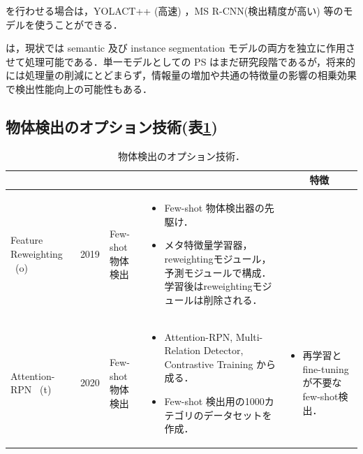 \documentclass[twocolumn]{jsarticle} %
\begin{document}
を行わせる場合は，YOLACT++ (高速) \cite{BZXL20}，MS R-CNN(検出精度が高い) \cite{HHGHW19} 等のモデルを使うことができる．

は，現状では semantic 及び instance segmentation モデルの両方を独立に作用させて処理可能である．単一モデルとしての PS はまだ研究段階であるが，将来的には処理量の削減にとどまらず，情報量の増加や共通の特徴量の影響の相乗効果で検出性能向上の可能性もある．

\subsection{物体検出のオプション技術(表\ref{tbl-select-sub})}
\begin{table}
    \caption{物体検出のオプション技術．}
    \label{tbl-select-sub}
    \begin{center}
        \setlength{\tabcolsep}{3pt}
        \footnotesize
        \begin{tabularx}{\linewidth}{XcXp{7cm}X} \toprule
            \centering{モデル名称[文献]} & \centering{発行年} & \centering{用途} & \centering{概要} & \multicolumn{1}{c}{特徴} \\ \midrule

            Feature Reweighting \cite{KLWYFD19} \ (o)
            \vspace{0.7\baselineskip}
            \footnote[1] 
             & 2019 & Few-shot 物体検出 & 
            \begin{itemize}
                \vspace{-0.7\baselineskip}
                \setlength{\leftskip}{-3mm}
                \item Few-shot 物体検出器の先駆け．
                \item メタ特徴量学習器，reweightingモジュール，予測モジュールで構成．学習後はreweightingモジュールは削除される．
            \end{itemize}
            &
            \\

            Attention-RPN \cite{FZTT20} \ (t)
            \vspace{0.7\baselineskip}
            \footnote[2] & 2020 & Few-shot 物体検出 & 
            \begin{itemize}
                \vspace{-0.7\baselineskip}
                \setlength{\leftskip}{-3mm}
                \item Attention-RPN, Multi-Relation Detector, Contrastive Training から成る．
                \item Few-shot 検出用の1000カテゴリのデータセットを作成．
            \end{itemize}
            &
            \begin{itemize}
                \vspace{-0.7\baselineskip}
                \setlength{\leftskip}{-3mm}
                \item 再学習とfine-tuningが不要なfew-shot検出．
            \end{itemize}
            \\


\end{tabularx}
\end{center}
\end{table}
\end{document}
